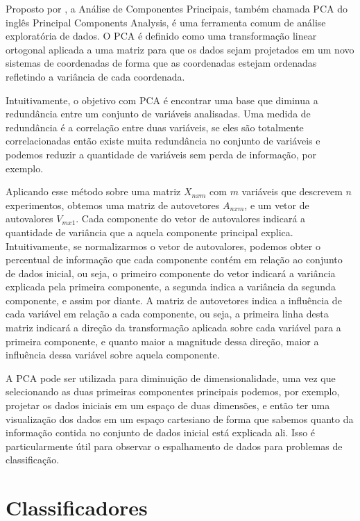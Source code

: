 Proposto por , a Análise de Componentes Principais, também chamada PCA do inglês Principal Components Analysis, é uma ferramenta comum de análise exploratória de dados. O PCA é definido como uma transformação linear ortogonal aplicada a uma matriz para que os dados sejam projetados em um novo sistemas de coordenadas de forma que as coordenadas estejam ordenadas refletindo a variância de cada coordenada.

Intuitivamente, o objetivo com PCA é encontrar uma base que diminua a redundância entre um conjunto de variáveis analisadas. Uma medida de redundância é a correlação entre duas variáveis, se eles são totalmente correlacionadas então existe muita redundância no conjunto de variáveis e podemos reduzir a quantidade de variáveis sem perda de informação, por exemplo.

Aplicando esse método sobre uma matriz $X_{nxm}$ com $m$ variáveis que descrevem $n$ experimentos, obtemos uma matriz de autovetores $A_{nxm}$, e um vetor de autovalores $V_{mx1}$. Cada componente do vetor de autovalores indicará a quantidade de variância que a aquela componente principal explica. Intuitivamente, se normalizarmos o vetor de autovalores, podemos obter o percentual de informação que cada componente contém em relação ao conjunto de dados inicial, ou seja, o primeiro componente do vetor indicará a variância explicada pela primeira componente, a segunda indica a variância da segunda componente, e assim por diante. A matriz de autovetores indica a influência de cada variável em relação a cada componente, ou seja, a primeira linha desta matriz indicará a direção da transformação aplicada sobre cada variável para a primeira componente, e quanto maior a magnitude dessa direção, maior a influência dessa variável sobre aquela componente.

A PCA pode ser utilizada para diminuição de dimensionalidade, uma vez que selecionando as duas primeiras componentes principais podemos, por exemplo, projetar os dados iniciais em um espaço de duas dimensões, e então ter uma visualização dos dados em um espaço cartesiano de forma que sabemos quanto da informação contida no conjunto de dados inicial está explicada ali. Isso é particularmente útil para observar o espalhamento de dados para problemas de classificação.

\section{Classificadores}
\label{section:metodologia:classificadores}

